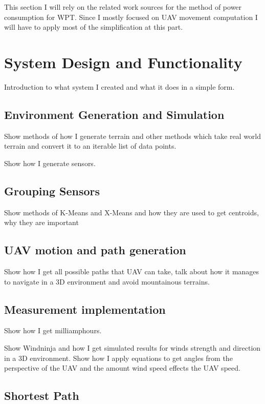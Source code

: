 \documentclass[11pt,a4paper,footinclude=true,headinclude=true, oneside]{scrbook}
\begin{document}
This section I will rely on the related work sources for the method of power consumption for WPT. Since I mostly focused on UAV movement computation I will have to apply most of the simplification at this part.

\chapter{System Design and Functionality}

Introduction to what system I created and what it does in a simple form.

\section{Environment Generation and Simulation}

Show methods of how I generate terrain and other methods which take real world terrain and convert it to an iterable list of data points.

Show how I generate sensors.

\section{Grouping Sensors}

Show methods of K-Means and X-Means and how they are used to get centroids, why they are important

\section{UAV motion and path generation}

Show how I get all possible paths that UAV can take, talk about how it manages to navigate in a 3D environment and avoid mountainous terrains.

\section{Measurement implementation}

Show how I get milliamphours.

Show Windninja and how I get simulated results for winds strength and direction in a 3D environment. Show how I apply equations to get angles from the perspective of the UAV and the amount wind speed effects the UAV speed.


\section{Shortest Path}
\end{document}
